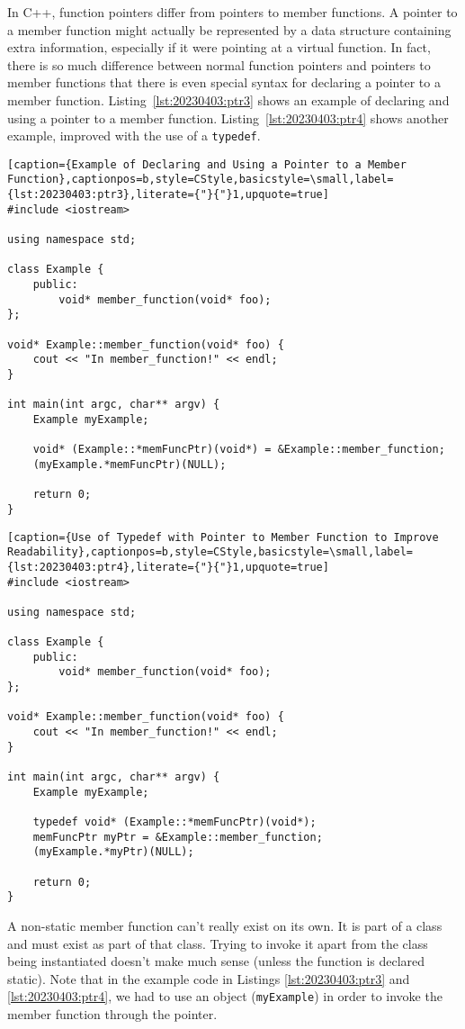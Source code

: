 In C++, function pointers differ from pointers to member functions. A pointer to a member function might actually be represented by a data structure containing extra information, especially if it were pointing at a virtual function.\autocite{20230403:ptm} In fact, there is so much difference between normal function pointers and pointers to member functions that there is even special syntax for declaring a pointer to a member function. Listing~\ref{lst:20230403:ptr3} shows an example of declaring and using a pointer to a member function. Listing~\ref{lst:20230403:ptr4} shows another example, improved with the use of a \texttt{typedef}.

\begin{lstlisting}[caption={Example of Declaring and Using a Pointer to a Member Function},captionpos=b,style=CStyle,basicstyle=\small,label={lst:20230403:ptr3},literate={"}{"}1,upquote=true]
#include <iostream>

using namespace std;

class Example {
	public:
		void* member_function(void* foo);
};

void* Example::member_function(void* foo) {
	cout << "In member_function!" << endl;
}

int main(int argc, char** argv) {
	Example myExample;

	void* (Example::*memFuncPtr)(void*) = &Example::member_function;
	(myExample.*memFuncPtr)(NULL);

	return 0;
}
\end{lstlisting}
\begin{lstlisting}[caption={Use of Typedef with Pointer to Member Function to Improve Readability},captionpos=b,style=CStyle,basicstyle=\small,label={lst:20230403:ptr4},literate={"}{"}1,upquote=true]
#include <iostream>

using namespace std;

class Example {
	public:
		void* member_function(void* foo);
};

void* Example::member_function(void* foo) {
	cout << "In member_function!" << endl;
}

int main(int argc, char** argv) {
	Example myExample;

	typedef void* (Example::*memFuncPtr)(void*);
	memFuncPtr myPtr = &Example::member_function;
	(myExample.*myPtr)(NULL);

	return 0;
}
\end{lstlisting}

A non-static member function can't really exist on its own. It is part of a class and must exist as part of that class. Trying to invoke it apart from the class being instantiated doesn't make much sense (unless the function is declared static\autocite{20230403:ptm}). Note that in the example code in Listings \ref{lst:20230403:ptr3} and \ref{lst:20230403:ptr4}, we had to use an object (\texttt{myExample}) in order to invoke the member function through the pointer.


